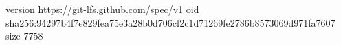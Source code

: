 version https://git-lfs.github.com/spec/v1
oid sha256:94297b4f7e829fea75e3a28b0d706cf2c1d71269fe2786b8573069d971fa7607
size 7758
